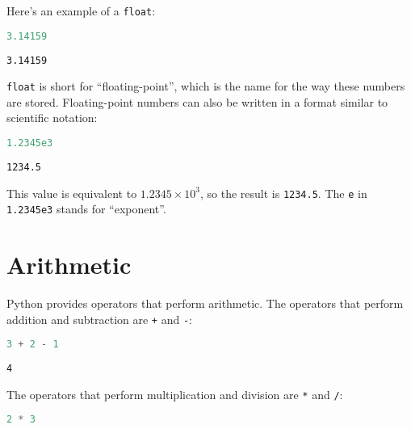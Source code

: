 \pagebreak

Here's an example of a \passthrough{\lstinline!float!}:

\begin{lstlisting}[language=Python,style=source]
3.14159
\end{lstlisting}

\begin{lstlisting}[style=output]
3.14159
\end{lstlisting}

\passthrough{\lstinline!float!} is short for ``floating-point'', which
is the name for the way these numbers are stored. Floating-point numbers
can also be written in a format similar to scientific notation:

\begin{lstlisting}[language=Python,style=source]
1.2345e3
\end{lstlisting}

\begin{lstlisting}[style=output]
1234.5
\end{lstlisting}

This value is equivalent to \(1.2345 \times 10^{3}\), so the result is
\passthrough{\lstinline!1234.5!}. The \passthrough{\lstinline!e!} in
\passthrough{\lstinline!1.2345e3!} stands for ``exponent''.

\section{Arithmetic}\label{arithmetic}

Python provides operators that perform arithmetic. The operators that
perform addition and subtraction are \passthrough{\lstinline!+!} and
\passthrough{\lstinline!-!}:

\begin{lstlisting}[language=Python,style=source]
3 + 2 - 1
\end{lstlisting}

\begin{lstlisting}[style=output]
4
\end{lstlisting}

The operators that perform multiplication and division are
\passthrough{\lstinline!*!} and \passthrough{\lstinline!/!}:

\begin{lstlisting}[language=Python,style=source]
2 * 3
\end{lstlisting}


